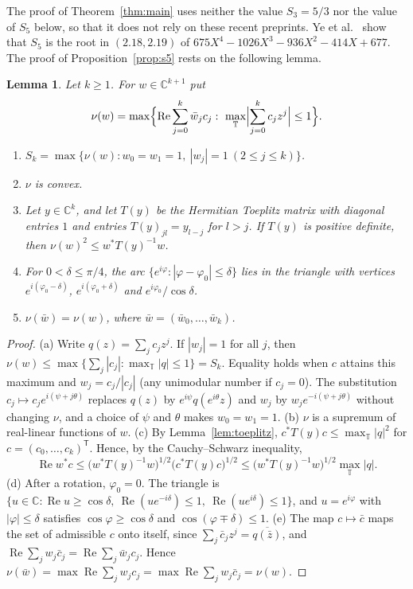 \documentclass[11pt]{amsart}
\newtheorem{lemma}[theorem]{Lemma}
\theoremstyle{remark}
\numberwithin{equation}{section}
\newcommand{\C}{\mathbb{C}}
\newcommand{\T}{\mathbb{T}}
\begin{document}
The proof of Theorem~\ref{thm:main} uses neither the value $S_3=5/3$ nor the value of $S_5$ below, so that it does not rely on these recent preprints. Ye et al.\ \cite[Theorem~1.1]{Ye26} show that $S_5$ is the root in $(2.18,2.19)$ of $675X^4-1026X^3-936X^2-414X+677$. The proof of Proposition~\ref{prop:s5} rests on the following lemma.

\begin{lemma}\label{lem:dual}
Let $k\ge1$. For $w\in\C^{k+1}$ put
\[
\nu(w)=\max\Bigl\{\operatorname{Re}\sum_{j=0}^k\bar w_jc_j:\ \max_\T\Bigl|\sum_{j=0}^kc_jz^j\Bigr|\le1\Bigr\}.
\]
\begin{enumerate}[label=\textup{(\alph*)}]
\item $S_k=\max\{\nu(w):w_0=w_1=1,\ |w_j|=1\ (2\le j\le k)\}$.
\item $\nu$ is convex.
\item Let $y\in\C^k$, and let $T(y)$ be the Hermitian Toeplitz matrix with diagonal entries $1$ and entries $T(y)_{jl}=y_{l-j}$ for $l>j$. If $T(y)$ is positive definite, then $\nu(w)^2\le w^*T(y)^{-1}w$.
\item For $0<\delta\le\pi/4$, the arc $\{e^{i\varphi}:|\varphi-\varphi_0|\le\delta\}$ lies in the triangle with vertices $e^{i(\varphi_0-\delta)}$, $e^{i(\varphi_0+\delta)}$ and $e^{i\varphi_0}/\cos\delta$.
\item $\nu(\bar w)=\nu(w)$, where $\bar w=(\bar w_0,\dots,\bar w_k)$.
\end{enumerate}
\end{lemma}

\begin{proof}
(a) Write $q(z)=\sum_jc_jz^j$. If $|w_j|=1$ for all $j$, then $\nu(w)\le\max\{\sum_j|c_j|:\max_\T|q|\le1\}=S_k$. Equality holds when $c$ attains this maximum and $w_j=c_j/|c_j|$ (any unimodular number if $c_j=0$). The substitution $c_j\mapsto c_je^{i(\psi+j\theta)}$ replaces $q(z)$ by $e^{i\psi}q(e^{i\theta}z)$ and $w_j$ by $w_je^{-i(\psi+j\theta)}$ without changing $\nu$, and a choice of $\psi$ and $\theta$ makes $w_0=w_1=1$.
(b) $\nu$ is a supremum of real-linear functions of $w$.
(c) By Lemma~\ref{lem:toeplitz}, $c^*T(y)c\le\max_\T|q|^2$ for $c=(c_0,\dots,c_k)^{\mathsf T}$. Hence, by the Cauchy--Schwarz inequality,
\[
\operatorname{Re}w^*c\le\bigl(w^*T(y)^{-1}w\bigr)^{1/2}\bigl(c^*T(y)c\bigr)^{1/2}\le\bigl(w^*T(y)^{-1}w\bigr)^{1/2}\max_\T|q|.
\]
(d) After a rotation, $\varphi_0=0$. The triangle is $\{u\in\C:\operatorname{Re}u\ge\cos\delta,\ \operatorname{Re}(ue^{-i\delta})\le1,\ \operatorname{Re}(ue^{i\delta})\le1\}$, and $u=e^{i\varphi}$ with $|\varphi|\le\delta$ satisfies $\cos\varphi\ge\cos\delta$ and $\cos(\varphi\mp\delta)\le1$.
(e) The map $c\mapsto\bar c$ maps the set of admissible $c$ onto itself, since $\sum_j\bar c_jz^j=\overline{q(\bar z)}$, and $\operatorname{Re}\sum_jw_j\bar c_j=\operatorname{Re}\sum_j\bar w_jc_j$. Hence $\nu(\bar w)=\max\operatorname{Re}\sum_jw_jc_j=\max\operatorname{Re}\sum_jw_j\bar c_j=\nu(w)$.
\end{proof}
\end{document}
